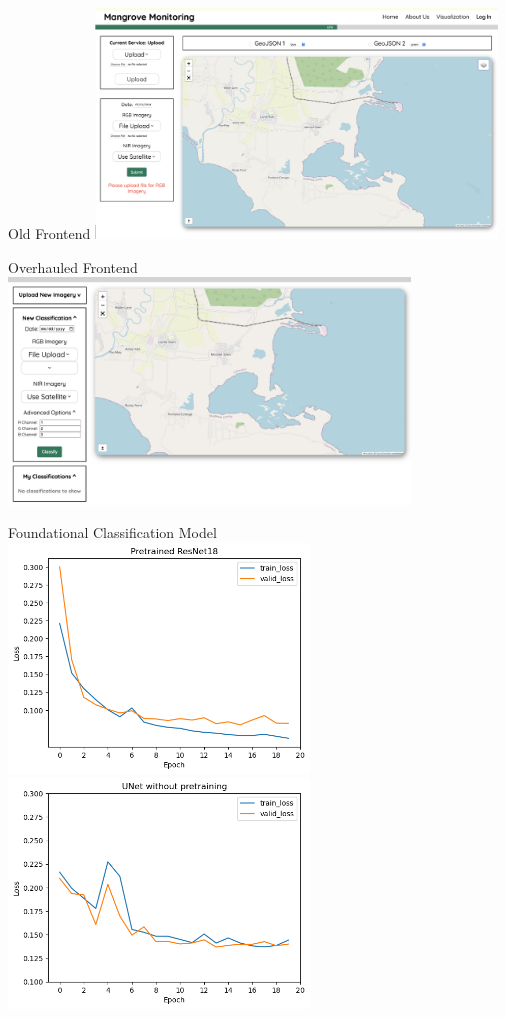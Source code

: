 \begin{frame}{Old Frontend}
    \centering
    \includegraphics[height=0.8\textheight,width=0.8\textwidth,keepaspectratio]{images/mm_oldfrontend.png} 
\end{frame}

\begin{frame}{Overhauled Frontend}
    \centering
    \includegraphics[height=0.8\textheight,width=0.8\textwidth,keepaspectratio]{images/mm_frontend.png} 
\end{frame}

\begin{frame}{Foundational Classification Model}
    \centering
    \includegraphics[height=0.6\textheight,width=0.6\textwidth,keepaspectratio]{images/pretrained.png}
    \includegraphics[height=0.6\textheight,width=0.6\textwidth,keepaspectratio]{images/untrained.png}
\end{frame}

